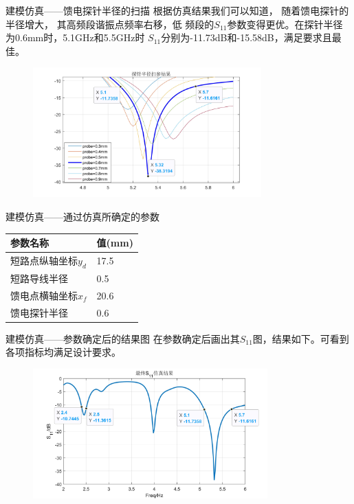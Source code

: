 \documentclass[10pt]{beamer}
\begin{document}
\begin{frame}{建模仿真——{\normalsize 馈电探针半径的扫描}}
	\qquad 根据仿真结果我们可以知道，
	随着馈电探针的半径增大，
	其高频段谐振点频率右移，低
	频段的$S_{11}$参数变得更优。在探针半径为0.6mm时，5.1GHz和5.5GHz时
	$S_{11}$分别为-11.73dB和-15.58dB，满足要求且最佳。
	\begin{figure}[htbp]
		\centering
		\includegraphics[height=5cm]{figs/probe2.jpg}
	\end{figure}
\end{frame}

\begin{frame}{建模仿真——{\normalsize 通过仿真所确定的参数}}
	\begin{table}
	\begin{tabular}{|p{6cm}|p{3cm}|}
		\hline
		参数名称& 值(mm)\\
		\hline 
		
		\hline
		短路点纵轴坐标$y_d$& 17.5\\
		\hline
		短路导线半径		& 0.5\\
		\hline
		馈电点横轴坐标$x_f$& 20.6\\
		\hline
		馈电探针半径&0.6\\
\hline
	\end{tabular}	
	\end{table}
\end{frame}
\begin{frame}{建模仿真——{\normalsize 参数确定后的结果图}}
	\qquad 在参数确定后画出其$S_{11}$图，结果如下。可看到各项指标均满足设计要求。
	\begin{figure}[htbp]
		\centering
		\includegraphics[height=5cm]{figs/final_S11.jpg}
	\end{figure}
\end{frame}
\end{document}
